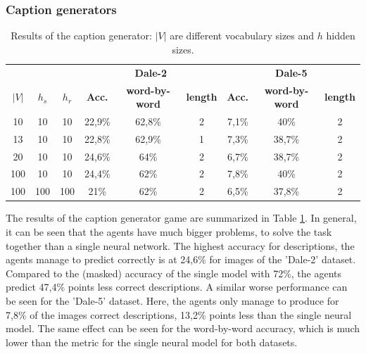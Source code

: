 \subsubsection{Caption generators}
\begin{table}[h]
    \centering
    \begin{tabular}{ccc|ccc|ccc}
        \toprule
              &         &         & \multicolumn{3}{c}{\textbf{Dale-2}} & \multicolumn{3}{c}{\textbf{Dale-5}}                                                                             \\\cmidrule(lr){4-6}\cmidrule(lr){7-9}
        $|V|$ & $h_{s}$ & $h_{r}$ & \textbf{Acc.}                       & \textbf{word-by-word}               & \textbf{length} & \textbf{Acc.} & \textbf{word-by-word} & \textbf{length} \\\midrule
        {10}  & {10}    & {10}    & {22,9\%}                            & {62,8\%}                            & {2}             & {7,1\%}       & {40\%}                & {2}             \\
        {13}  & {10}    & {10}    & {22,8\%}                            & {62,9\%}                            & {1}             & {7,3\%}       & {38,7\%}              & {2}             \\
        {20}  & {10}    & {10}    & {24,6\%}                            & {64\%}                              & {2}             & {6,7\%}       & {38,7\%}              & {2}             \\
        {100} & {10}    & {10}    & {24,4\%}                            & {62\%}                              & {2}             & {7,8\%}       & {40\%}                & {2}             \\
        {100} & {100}   & {100}   & {21\%}                              & {62\%}                              & {2}             & {6,5\%}       & {37,8\%}              & {2}             \\
        \bottomrule
    \end{tabular}
    \caption{Results of the caption generator: $|V|$ are different vocabulary sizes and $h$ hidden sizes.}
    \label{tab:results_caption_generator_game}
\end{table}

The results of the caption generator game are summarized in Table \ref{tab:results_caption_generator_game}.
In general, it can be seen that the agents have much bigger problems, to solve the task together than a single neural network.
The highest accuracy for descriptions, the agents manage to predict correctly is at 24,6\% for images of the 'Dale-2' dataset.
Compared to the (masked) accuracy of the single model with 72\%, the agents predict 47,4\% points less correct descriptions.
A similar worse performance can be seen for the 'Dale-5' dataset.
Here, the agents only manage to produce for 7,8\% of the images correct descriptions, 13,2\% points less than the single neural model.
The same effect can be seen for the word-by-word accuracy, which is much lower than the metric for the single neural model for both datasets.

